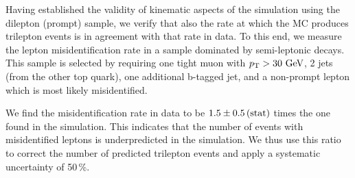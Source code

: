 Having established the validity of kinematic aspects of the \ttbar simulation using the dilepton (prompt) sample, we verify that also the rate at which the \ttbar MC produces trilepton events is in agreement with that rate in data. To this end, we measure the lepton misidentification rate in a sample dominated by semi-leptonic \ttbar decays. This sample is selected by requiring one tight muon with $p_{\mathrm{T}} > 30\,\,\text{Ge\hspace{-.08em}V}$, 2 jets (from the other top quark), one additional b-tagged jet, and a non-prompt lepton which is most likely misidentified.

We find the misidentification rate in data to be $1.5 \pm 0.5\,\text{(stat)}$ times the one found in the \ttbar simulation. This indicates that the number of events with misidentified leptons is underpredicted in the \ttbar simulation. We thus use this ratio to correct the number of predicted trilepton events and apply a systematic uncertainty of 50\,\%.
